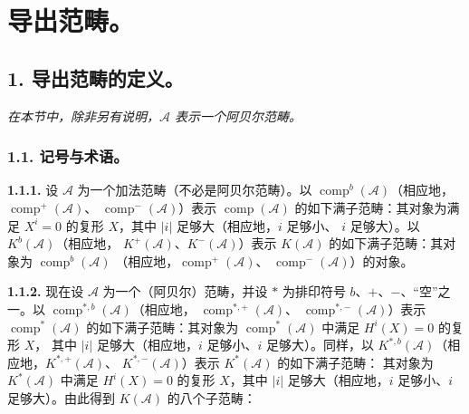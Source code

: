 \chapter{导出范畴。}
%
\begingroup
\small
\setlength{\parskip}{0pt}
\setlength{\emergencystretch}{1.5em}
\setlength{\abovedisplayskip}{4pt plus 2pt minus 2pt}%
\setlength{\belowdisplayskip}{4pt plus 2pt minus 2pt}%

\section*{1. 导出范畴的定义。}

\noindent\textit{在本节中，除非另有说明，$\mathcal A$ 表示一个阿贝尔范畴。}

\subsection*{1.1. 记号与术语。}

\noindent\textbf{1.1.1.}\quad
设 $\mathcal A$ 为一个加法范畴（不必是阿贝尔范畴）。以
$\operatorname{comp}^{b}(\mathcal A)$（相应地，
$\operatorname{comp}^{+}(\mathcal A)$、
$\operatorname{comp}^{-}(\mathcal A)$）表示
$\operatorname{comp}(\mathcal A)$ 的如下满子范畴：其对象为满足
$X^i=0$ 的复形 $X$，其中 $|i|$ 足够大（相应地，$i$ 足够小、
$i$ 足够大）。以 $K^{b}(\mathcal A)$（相应地，
$K^{+}(\mathcal A)$、$K^{-}(\mathcal A)$）表示 $K(\mathcal A)$
的如下满子范畴：其对象为 $\operatorname{comp}^{b}(\mathcal A)$
（相应地，$\operatorname{comp}^{+}(\mathcal A)$、
$\operatorname{comp}^{-}(\mathcal A)$）的对象。

\noindent\textbf{1.1.2.}\quad
现在设 $\mathcal A$ 为一个（阿贝尔）范畴，并设 $*$ 为排印符号
$b$、$+$、$-$、“空”之一。以
$\operatorname{comp}^{*,b}(\mathcal A)$（相应地，
$\operatorname{comp}^{*,+}(\mathcal A)$、
$\operatorname{comp}^{*,-}(\mathcal A)$）表示
$\operatorname{comp}^{*}(\mathcal A)$ 的如下满子范畴：其对象为
$\operatorname{comp}^{*}(\mathcal A)$ 中满足 $H^i(X)=0$ 的复形 $X$，
其中 $|i|$ 足够大（相应地，$i$ 足够小、$i$ 足够大）。同样，以
$K^{*,b}(\mathcal A)$（相应地，$K^{*,+}(\mathcal A)$、
$K^{*,-}(\mathcal A)$）表示 $K^{*}(\mathcal A)$ 的如下满子范畴：
其对象为 $K^{*}(\mathcal A)$ 中满足 $H^i(X)=0$ 的复形 $X$，其中
$|i|$ 足够大（相应地，$i$ 足够小、$i$ 足够大）。由此得到
$K(\mathcal A)$ 的八个子范畴：

